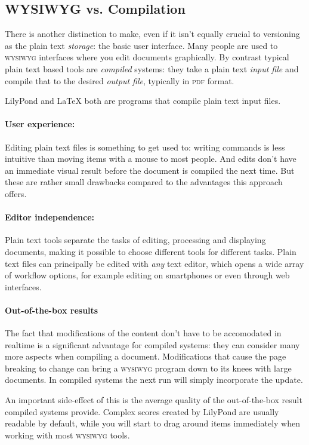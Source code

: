 \documentclass[11pt,a4paper]{article}
\begin{document}
\subsection{WYSIWYG vs. Compilation}
There is another distinction to make, even if it isn't equally crucial to versioning
as the plain text \emph{storage}: the basic user interface. Many people are used to
\textsc{wysiwyg} interfaces where you edit documents graphically. By contrast typical
plain text based tools are \emph{compiled} systems: they take a plain text \emph{input
file} and compile that to the desired \emph{output file}, typically in
\textsc{pdf} format.

LilyPond and \LaTeX{} both are programs that compile plain text input files.

\paragraph{User experience:}
Editing plain text files is something to get used to: writing commands is less intuitive
than moving items with a mouse to most people. And edits don't have an immediate visual
result before the document is compiled the next time. But these are rather small drawbacks
compared to the advantages this approach offers.

\paragraph{Editor independence:}
Plain text tools separate the tasks of editing, processing and displaying documents,
making it possible to choose different tools for different tasks. Plain text files
can principally be edited with \emph{any} text editor, which opens a wide array of
workflow options, for example editing on smartphones or even through web interfaces.

\paragraph{Out-of-the-box results}
The fact that modifications of the content don't have to be accomodated in realtime is
a significant advantage for compiled systems: they can consider many more aspects when
compiling a document. Modifications that cause the page breaking to change can bring a
\textsc{wysiwyg} program down to its knees with large documents. In compiled systems the
next run will simply incorporate the update.

An important side-effect of this is the average quality of the out-of-the-box result
compiled systems provide. Complex scores created by LilyPond are usually readable by
default, while you will start to drag around items immediately when working with most
\textsc{wysiwyg} tools.
\end{document}
